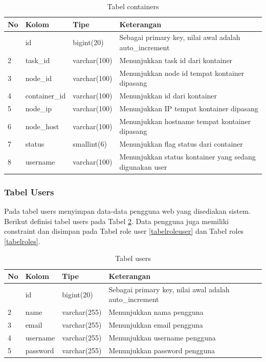 				\begin{longtable}{|p{}|p{}|p{}|p{}|}
					\caption{Tabel containers} \label{tabelcontainers} \\
					\hline
					\textbf{No} & \textbf{Kolom} & \textbf{Tipe} & \textbf{Keterangan} \\ \hline
					\endhead
					\endfoot
					\endlastfoot
					1 & id & bigint(20) & Sebagai primary key, nilai awal adalah auto\_increment \\ \hline
					2 & task\_id & varchar(100) & Menunjukkan task id dari kontainer \\ \hline
					3 & node\_id & varchar(100) & Menunjukkan node id tempat kontainer dipasang \\ \hline
					4 & container\_id & varchar(100) & Menunjukkan id dari kontainer \\ \hline
					5 & node\_ip & varchar(100) & Menunjukkan IP tempat kontainer dipasang \\ \hline
					6 & node\_host & varchar(100) & Menunjukkan hostname tempat kontainer dipasang \\ \hline
					7 & status & smallint(6) & Menunjukkan flag status dari container \\ \hline
					8 & username & varchar(100) & Menunjukkan status kontainer yang sedang digunakan user \\ \hline
				\end{longtable}
		
			\subsubsection{Tabel Users}
				Pada tabel users menyimpan data-data pengguna web yang disediakan sistem. Berikut definisi tabel users pada Tabel \ref{tabelusers}. Data pengguna juga memiliki constraint dan disimpan pada Tabel role user \ref{tabelroleuser} dan Tabel roles \ref{tabelroles}.
				
				\begin{longtable}{|p{}|p{}|p{}|p{}|}
					\caption{Tabel users} \label{tabelusers} \\
					\hline
					\textbf{No} & \textbf{Kolom} & \textbf{Tipe} & \textbf{Keterangan} \\ \hline
					\endhead
					\endfoot
					\endlastfoot
					1 & id & bigint(20) & Sebagai primary key, nilai awal adalah auto\_increment \\ \hline
					2 & name & varchar(255) & Menunjukkan nama pengguna \\ \hline
					3 & email & varchar(255) & Menunjukkan email pengguna \\ \hline
					4 & username & varchar(255) & Menunjukkan username pengguna \\ \hline
					5 & password & varchar(255) & Menunjukkan password pengguna \\ \hline
				\end{longtable}
			
